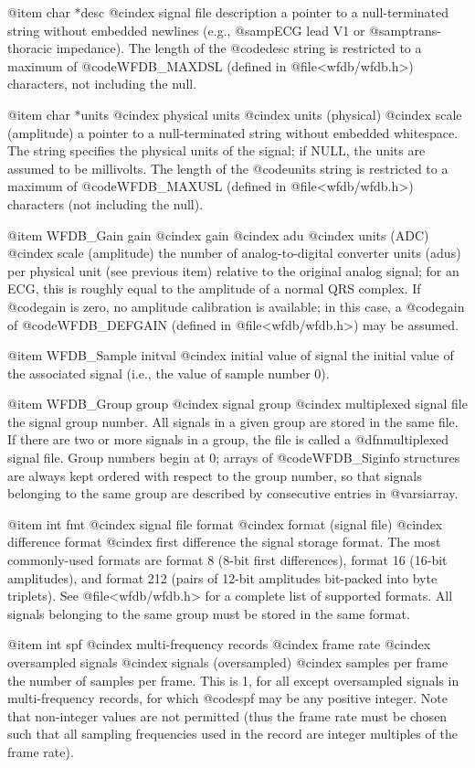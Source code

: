 {{{{{{{{{{@item char *desc
@cindex signal file description
a pointer to a null-terminated string without embedded newlines (e.g.,
@samp{ECG lead V1} or @samp{trans-thoracic impedance}).  The length of
the @code{desc} string is restricted to a maximum of @code{WFDB_MAXDSL}
(defined in @file{<wfdb/wfdb.h>}) characters, not including the null.

@item char *units
@cindex physical units
@cindex units (physical)
@cindex scale (amplitude)
a pointer to a null-terminated string without embedded whitespace.  The
string specifies the physical units of the signal; if NULL, the units
are assumed to be millivolts.  The length of the @code{units} string is
restricted to a maximum of @code{WFDB_MAXUSL} (defined in
@file{<wfdb/wfdb.h>}) characters (not including the null).

@item WFDB_Gain gain
@cindex gain
@cindex adu
@cindex units (ADC)
@cindex scale (amplitude)
the number of analog-to-digital converter units (adus) per physical unit
(see previous item) relative to the original analog signal; for an ECG,
this is roughly equal to the amplitude of a normal QRS complex.  If
@code{gain} is zero, no amplitude calibration is available; in this
case, a @code{gain} of @code{WFDB_DEFGAIN} (defined in
@file{<wfdb/wfdb.h>}) may be assumed.

@item WFDB_Sample initval
@cindex initial value of signal
the initial value of the associated signal (i.e., the value of sample
number 0).

@item WFDB_Group group
@cindex signal group
@cindex multiplexed signal file
the signal group number.  All signals in a given group are stored in the
same file.  If there are two or more signals in a group, the file is
called a @dfn{multiplexed signal file}.  Group numbers begin at 0;
arrays of @code{WFDB_Siginfo} structures are always kept ordered with respect
to the group number, so that signals belonging to the same group are
described by consecutive entries in @var{siarray}.

@item int fmt
@cindex signal file format
@cindex format (signal file)
@cindex difference format
@cindex first difference
the signal storage format.  The most commonly-used formats are format 8
(8-bit first differences), format 16 (16-bit amplitudes), and format 212
(pairs of 12-bit amplitudes bit-packed into byte triplets).  See
@file{<wfdb/wfdb.h>} for a complete list of supported formats.  All signals
belonging to the same group must be stored in the same format.

@item int spf
@cindex multi-frequency records
@cindex frame rate
@cindex oversampled signals
@cindex signals (oversampled)
@cindex samples per frame
the number of samples per frame.  This is 1, for all except oversampled
signals in multi-frequency records, for which @code{spf} may be any
positive integer.  Note that non-integer values are not permitted (thus
the frame rate must be chosen such that all sampling frequencies used in
the record are integer multiples of the frame rate).

}}}}}}}}}}
